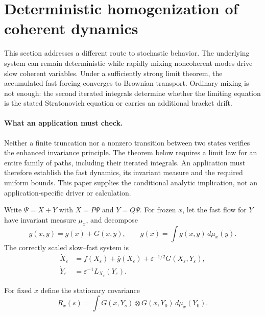 \documentclass[11pt]{article}
\begin{document}
\section{Deterministic homogenization of coherent dynamics}

This section addresses a different route to stochastic behavior.  The
underlying system can remain deterministic while rapidly mixing
noncoherent modes drive slow coherent variables.  Under a sufficiently strong
limit theorem, the accumulated fast forcing converges to Brownian transport.
Ordinary mixing is not enough: the second iterated integrals determine whether
the limiting equation is the stated Stratonovich equation or carries an
additional bracket drift.

\paragraph{What an application must check.}
Neither a finite truncation nor a nonzero transition between two states
verifies the enhanced invariance principle. The theorem below requires a
limit law for an entire family of paths, including their iterated integrals.
An application must therefore establish the fast dynamics, its invariant
measure and the required uniform bounds. This paper supplies the conditional
analytic implication, not an application-specific driver or calculation.

Write $\Psi=X+Y$ with $X=P\Psi$ and $Y=Q\Psi$. For frozen $x$, let the fast
flow for $Y$ have invariant measure $\mu_x$, and decompose
\[
g(x,y)=\bar g(x)+G(x,y),
\qquad
\bar g(x)=\int g(x,y)\,d\mu_x(y).
\]
The correctly scaled slow--fast system is
\begin{align}
\dot X_\varepsilon
&=f(X_\varepsilon)+\bar g(X_\varepsilon)
+\varepsilon^{-1/2}G(X_\varepsilon,Y_\varepsilon),\\
\dot Y_\varepsilon
&=\varepsilon^{-1}L_{X_\varepsilon}(Y_\varepsilon).
\label{eq:fastslow}
\end{align}

For fixed $x$ define the stationary covariance
\[
R_x(s)=\int G(x,Y_s)\otimes G(x,Y_0)\,d\mu_x(Y_0).
\]
\end{document}
